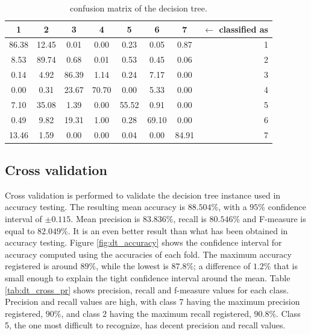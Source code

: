 \documentclass[a4paper, 10pt]{article}
\begin{document}
\begin{table}[H]
\centering
\begin{tabular}{|*{7}{c|}r|}
\hline

1 &2 &3 &4 &5 &6 &7 & $\leftarrow$ classified as \\\hline

\cellcolor{black!15}86.38 &12.45 &0.01 &0.00 &0.23 &0.05 &0.87 & 1 \\\hline

8.53 &\cellcolor{black!15}89.74 &0.68 &0.01 &0.53 &0.45 &0.06 & 2 \\\hline

0.14 &4.92 &\cellcolor{black!15}86.39 &1.14 &0.24 &7.17 &0.00 & 3 \\\hline

0.00 &0.31 &23.67 &\cellcolor{black!15}70.70 &0.00 &5.33 &0.00 & 4 \\\hline

7.10 &35.08 &1.39 &0.00 &\cellcolor{black!15}55.52 &0.91 &0.00 & 5 \\\hline

0.49 &9.82 &19.31 &1.00 &0.28 &\cellcolor{black!15}69.10 &0.00 & 6 \\\hline

13.46 &1.59 &0.00 &0.00 &0.04 &0.00 &\cellcolor{black!15}84.91 & 7 \\\hline

\end{tabular}
\caption{confusion matrix of the decision tree.}
\label{tab:dt_cm}
\end{table}

\subsection{Cross validation}

Cross validation is performed to validate the decision tree instance used in accuracy testing. The resulting mean accuracy is $88.504\%$, with a $95\%$ confidence interval of $\pm 0.115$. Mean precision is $83.836\%$, recall is $80.546\%$ and F-measure is equal to $82.049\%$. It is an even better result than what has been obtained in accuracy testing. Figure \ref{fig:dt_accuracy} shows the confidence interval for accuracy computed using the accuracies of each fold. The maximum accuracy registered is around $89\%$, while the lowest is $87.8\%$; a difference of $1.2\%$ that is small enough to explain the tight confidence interval around the mean. Table \ref{tab:dt_cross_pr} shows precision, recall and f-measure values for each class. Precision and recall values are high, with class 7 having the maximum precision registered, $90\%$, and class 2 having the maximum recall registered, $90.8\%$. Class 5, the one most difficult to recognize, has decent precision and recall values.
\end{document}
